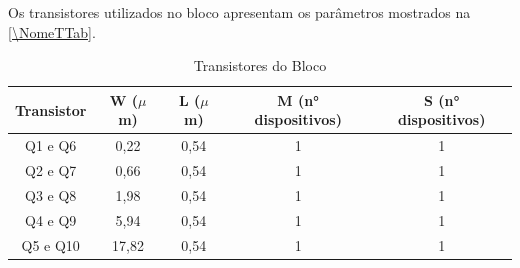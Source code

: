 Os transistores utilizados no bloco \NomeBloco{} apresentam os par\^ametros mostrados na \autoref{\NomeTTab}.

\begin{table}[htb]
\caption{Transistores do Bloco \NomeBloco}
\label{\NomeTTab}
\centering
\begin{tabular}{ccccc}
\toprule
Transistor & W ($\mu$m)  & L ($\mu$m)           & M (n° dispositivos) & S (n° dispositivos)\\
\midrule \midrule
Q1 e Q6 & 0,22 & 0,54 & 1 & 1\\
\midrule
Q2 e Q7 & 0,66 & 0,54 & 1 & 1\\
\midrule
Q3 e Q8 & 1,98 & 0,54 & 1 & 1\\
\midrule
Q4 e Q9 & 5,94 & 0,54 & 1 & 1\\
\midrule
Q5 e Q10 & 17,82 & 0,54 & 1 & 1\\
\bottomrule
\end{tabular}
\end{table}